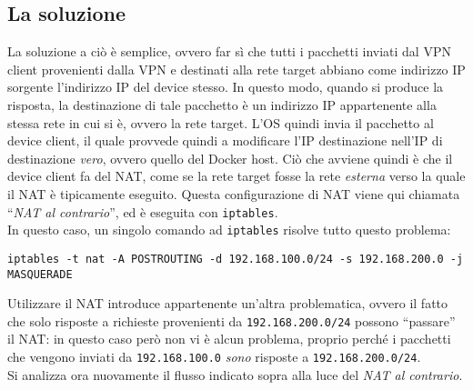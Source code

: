 \subsection{La soluzione}
La soluzione a ciò è semplice, ovvero far sì che tutti i pacchetti inviati dal
VPN client provenienti dalla VPN e destinati alla rete target abbiano come
indirizzo IP sorgente l'indirizzo IP del device stesso. In questo modo, quando si
produce la risposta, la destinazione di tale pacchetto è un indirizzo IP appartenente
alla stessa rete in cui si è, ovvero la rete target. L'OS quindi invia il
pacchetto al device client, il quale provvede quindi a modificare
l'IP destinazione nell'IP di destinazione \textit{vero}, ovvero quello del Docker host.
Ciò che avviene quindi è che il device client fa del NAT, come se la rete target
fosse la rete \textit{esterna} verso la quale il NAT è tipicamente eseguito. Questa
configurazione di NAT viene qui chiamata ``\textit{NAT al contrario}'', ed è eseguita con
\texttt{iptables}.\\
In questo caso, un singolo comando ad \texttt{iptables} risolve tutto questo problema:
\begin{verbatim}
iptables -t nat -A POSTROUTING -d 192.168.100.0/24 -s 192.168.200.0 -j MASQUERADE
\end{verbatim}
Utilizzare il NAT introduce appartenente un'altra problematica, ovvero il fatto che
solo risposte a richieste provenienti da \texttt{192.168.200.0/24} possono ``passare''
il NAT: in questo caso però non vi è alcun problema, proprio perché i pacchetti che
vengono inviati da \texttt{192.168.100.0} \textit{sono} risposte a
\texttt{192.168.200.0/24}.\\
Si analizza ora nuovamente il flusso indicato sopra alla luce del \textit{NAT al contrario}.
